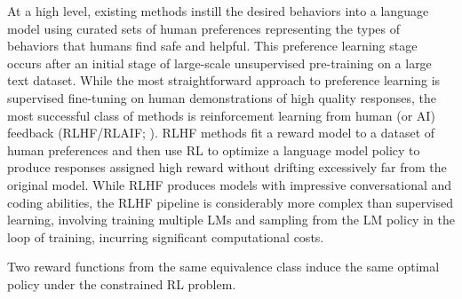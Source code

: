 At a high level, existing methods instill the desired behaviors into a language model using curated sets of human preferences representing the types of behaviors that humans find safe and helpful. This preference learning stage occurs after an initial stage of large-scale unsupervised pre-training on a large text dataset. While the most straightforward approach to preference learning is supervised fine-tuning on human demonstrations of high quality responses, the most successful class of methods is reinforcement learning from human (or AI) feedback (RLHF/RLAIF; \citep{christiano2017deep,bai2022constitutional}). RLHF methods fit a reward model to a dataset of human preferences and then use RL to optimize a language model policy to produce responses assigned high reward without drifting excessively far from the original model. While RLHF produces models with impressive conversational and coding abilities, the RLHF pipeline is considerably more complex than supervised learning, involving training multiple LMs and sampling from the LM policy in the loop of training, incurring significant computational costs.

\begin{lemma}\label{lemma:same_policy}
    Two reward functions from the same equivalence class induce the same optimal policy under the constrained RL problem.
\end{lemma}


